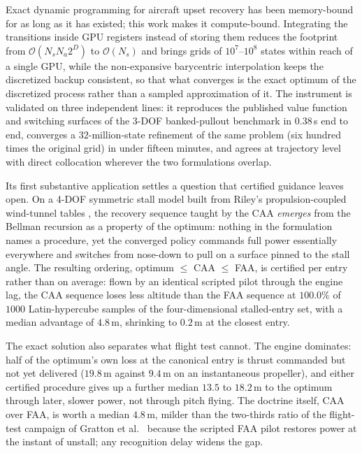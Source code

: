\documentclass[journal ]{new-aiaa}
\begin{document}
Exact dynamic programming for aircraft upset recovery has been
memory-bound for as long as it has existed; this work makes it
compute-bound. Integrating the transitions inside GPU registers
instead of storing them reduces the footprint from
$\mathcal{O}(N_s N_a 2^D)$ to $\mathcal{O}(N_s)$ and brings grids of
$10^7$--$10^8$ states within reach of a single GPU, while the
non-expansive barycentric interpolation keeps the discretized backup
consistent, so that what converges is the exact optimum of the
discretized process rather than a sampled approximation of it. The instrument is validated on three independent
lines: it reproduces the published value function and switching
surfaces of the 3-DOF banked-pullout benchmark \cite{Bunge2018} in $0.38$\,s end to
end, converges a $32$-million-state refinement of the same problem
(six hundred times the original grid) in under fifteen
minutes, and agrees at trajectory level with direct collocation
wherever the two formulations overlap.

Its first substantive application settles a question that certified
guidance leaves open. On a 4-DOF symmetric stall model built from
Riley's propulsion-coupled wind-tunnel tables \cite{Riley1985}, the recovery sequence
taught by the CAA \emph{emerges} from the Bellman recursion as a
property of the optimum: nothing in the formulation names a
procedure, yet the converged policy commands full power essentially
everywhere and switches from nose-down to pull on a surface pinned to
the stall angle. The resulting ordering, optimum $\le$ CAA $\le$
FAA, is certified per entry rather than on average: flown by an
identical scripted pilot through the engine lag, the CAA sequence
loses less altitude than the FAA sequence at $100.0\%$ of $1000$
Latin-hypercube samples of the four-dimensional stalled-entry set,
with a median advantage of $4.8$\,m, shrinking to $0.2$\,m at the
closest entry.

The exact solution also separates what flight test cannot. The
engine dominates: half of the optimum's own loss at the canonical
entry is thrust commanded but not yet delivered ($19.8$\,m against
$9.4$\,m on an instantaneous propeller), and either certified
procedure gives up a further median $13.5$ to $18.2$\,m to the
optimum through later, slower power, not through pitch flying. The
doctrine itself, CAA over FAA, is worth a median $4.8$\,m, milder
than the two-thirds ratio of the flight-test campaign of Gratton
et al.\ \cite{Gratton2014} because the scripted FAA pilot restores
power at the instant of unstall; any recognition delay widens the
gap.
\end{document}
